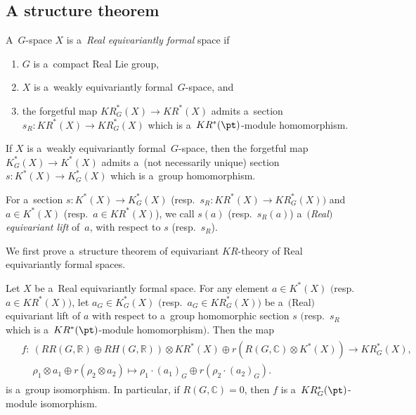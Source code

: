 \subsection{A structure theorem}
\begin{Definition}
\label{realequivformal}
A~$G$-space $X$ is a~\emph{Real equivariantly formal} space if
\begin{enumerate}\itemsep=0pt
\item[1)]
$G$ is a~compact Real Lie group,
\item[2)]
$X$ is a~weakly equivariantly formal~$G$-space, and
\item[3)]
the forgetful map $KR^*_G(X)\to KR^*(X)$ admits a~section $s_R: KR^*(X)\to KR^*_G(X)$ which is
a~$KR^*(\pt)$-module homomorphism.
\end{enumerate}
\end{Definition}
\begin{Remark}
If $X$ is a~weakly equivariantly formal~$G$-space, then the forgetful map $K_G^*(X)\to K^*(X)$ admits a~(not necessarily
unique) section $s: K^*(X)\to K_G^*(X)$ which is a~group homomorphism.
\end{Remark}
\begin{Definition}
For a~section $s: K^*(X)\to K^*_G(X)$ (resp.\
$s_R: KR^*(X)\to KR_G^*(X))$ and $a\in K^*(X)$ (resp.\
$a\in KR^*(X)$), we call $s(a)$ (resp.~$s_R(a)$) a~\emph{$($Real$)$ equivariant lift} of~$a$, with respect to $s$ (resp.~$s_R$).
\end{Definition}

We f\/irst prove a~structure theorem of equivariant $KR$-theory of Real equivariantly formal spaces.
\begin{Theorem}
\label{equivstrthm}
Let $X$ be a~Real equivariantly formal space.
For any element $a\in K^*(X)$ $($resp.\
$a\in KR^*(X))$, let $a_G\in K_G^*(X)$ $($resp.\
$a_G\in KR_G^*(X))$ be a~$($Real$)$ equivariant lift of $a$ with respect to a~group homomorphic section $s$ $($resp.~$s_R$ which is a~$KR^*(\pt)$-module homomorphism$)$.
Then the map
\begin{gather*}
\begin{split}
& f:  \ (RR(G, \mathbb{R})\oplus RH(G, \mathbb{R}))\otimes KR^*(X)\oplus r(R(G, \mathbb{C})\otimes K^*(X))  \to  KR_G^*(X),
\\
& \phantom{f: {}} \
\rho_1\otimes a_1\oplus r(\rho_2\otimes a_2)  \mapsto  \rho_1\cdot (a_1)_{G}\oplus r(\rho_2\cdot (a_2)_G).
\end{split}
\end{gather*}
is a~group isomorphism.
In particular, if $R(G, \mathbb{C})=0$, then $f$ is a~$KR_G^*(\pt)$-module isomorphism.
\end{Theorem}

